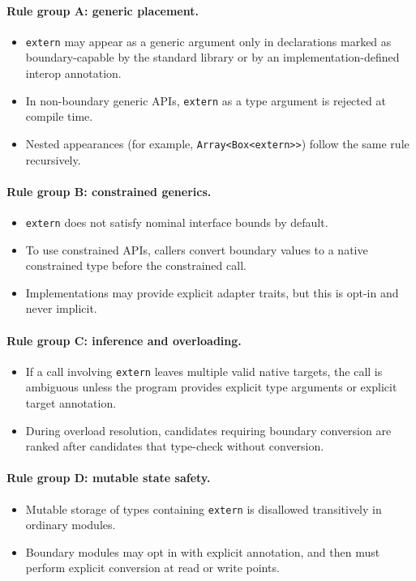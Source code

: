 \documentclass[11pt,a4paper]{article}
\begin{document}
\paragraph{Rule group A: generic placement.}
\begin{itemize}
  \item \texttt{extern} may appear as a generic argument only in declarations marked as boundary-capable by the standard library or by an implementation-defined interop annotation.
  \item In non-boundary generic APIs, \texttt{extern} as a type argument is rejected at compile time.
  \item Nested appearances (for example, \texttt{Array<Box<extern>>}) follow the same rule recursively.
\end{itemize}

\paragraph{Rule group B: constrained generics.}
\begin{itemize}
  \item \texttt{extern} does not satisfy nominal interface bounds by default.
  \item To use constrained APIs, callers convert boundary values to a native constrained type before the constrained call.
  \item Implementations may provide explicit adapter traits, but this is opt-in and never implicit.
\end{itemize}

\paragraph{Rule group C: inference and overloading.}
\begin{itemize}
  \item If a call involving \texttt{extern} leaves multiple valid native targets, the call is ambiguous unless the program provides explicit type arguments or explicit target annotation.
  \item During overload resolution, candidates requiring boundary conversion are ranked after candidates that type-check without conversion.
\end{itemize}

\paragraph{Rule group D: mutable state safety.}
\begin{itemize}
  \item Mutable storage of types containing \texttt{extern} is disallowed transitively in ordinary modules.
  \item Boundary modules may opt in with explicit annotation, and then must perform explicit conversion at read or write points.
\end{itemize}
\end{document}
